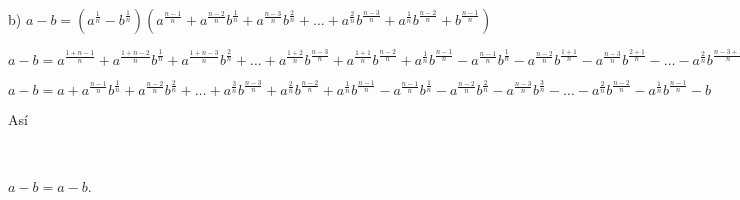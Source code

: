 \documentclass[12pt,a4paper,scrartcl]{article}
\begin{document}
{%
b) $a-b = 
(a^{\frac{1}{n}}-b^{\frac{1}{n}})(a^{\frac{n-1}{n}}+a^{\frac{n-2}{n}}b^{\frac{1}{n}}+a^{\frac{n-3}{n}}b^{\frac{2}{n}}+ \hdots +a^{\frac{2}{n}}b^{\frac{n-3}{n}}+a^{\frac{1}{n}}b^{\frac{n-2}{n}}+b^{\frac{n-1}{n}})$\linebreak
\begin{center}
$a-b=
a^{\frac{1+n-1}{n}}+a^{\frac{1+n-2}{n}}b^{\frac{1}{n}}+a^{\frac{1+n-3}{n}}b^{\frac{2}{n}}+\ldots+a^{\frac{1+2}{n}}b^{\frac{n-3}{n}}+a^{\frac{1+1}{n}}b^{\frac{n-2}{n}}+a^{\frac{1}{n}}b^{\frac{n-1}{n}}-a^{\frac{n-1}{n}}b^{\frac{1}{n}}-a^{\frac{n-2}{n}}b^{\frac{1+1}{n}}-a^{\frac{n-3}{n}}b^{\frac{2+1}{n}}-\ldots-a^{\frac{2}{n}}b^{\frac{n-3+1}{n}}-a^{\frac{1}{n}}b^{\frac{n-2+1}{n}}-b^{\frac{n-1+1}{n}}$
\end{center}

\begin{center}
$a-b=a+a^{\frac{n-1}{n}}b^{\frac{1}{n}}+a^{\frac{n-2}{n}}b^{\frac{2}{n}}+\ldots+a^{\frac{3}{n}}b^{\frac{n-3}{n}}+a^{\frac{2}{n}}b^{\frac{n-2}{n}}+a^{\frac{1}{n}}b^{\frac{n-1}{n}}-a^{\frac{n-1}{n}}b^{\frac{1}{n}}-a^{\frac{n-2}{n}}b^{\frac{2}{n}}-a^{\frac{n-3}{n}}b^{\frac{3}{n}}-\ldots-a^{\frac{2}{n}}b^{\frac{n-2}{n}}-a^{\frac{1}{n}}b^{\frac{n-1}{n}}-b$\\
\end{center}
\begin{flushleft}
As\'i 
\end{flushleft}\
\begin{center}
$a-b=a-b$.
\end{center}





}
\end{document}

